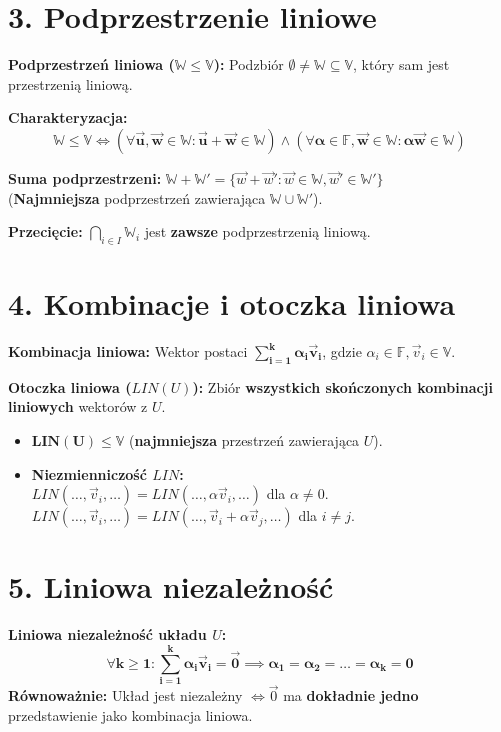 \documentclass[12pt,a4paper]{article}
\begin{document}
\section*{3. Podprzestrzenie liniowe}
\noindent\textbf{Podprzestrzeń liniowa ($\mathbb{W} \le \mathbb{V}$):} Podzbiór $\emptyset \neq \mathbb{W} \subseteq \mathbb{V}$, który sam jest przestrzenią liniową.

\noindent\textbf{Charakteryzacja:} 
$$ \mathbf{\mathbb{W} \le \mathbb{V} \iff (\forall \vec{u}, \vec{w} \in \mathbb{W}: \vec{u} + \vec{w} \in \mathbb{W}) \land (\forall \alpha \in \mathbb{F}, \vec{w} \in \mathbb{W}: \alpha\vec{w} \in \mathbb{W})} $$

\noindent\textbf{Suma podprzestrzeni:} $\mathbb{W} + \mathbb{W}' = \{\vec{w} + \vec{w}' : \vec{w} \in \mathbb{W}, \vec{w}' \in \mathbb{W}'\}$ \\
(\textbf{Najmniejsza} podprzestrzeń zawierająca $\mathbb{W} \cup \mathbb{W}'$).

\noindent\textbf{Przecięcie:} $\bigcap_{i \in I} \mathbb{W}_i$ jest \textbf{zawsze} podprzestrzenią liniową.

\section*{4. Kombinacje i otoczka liniowa}
\noindent\textbf{Kombinacja liniowa:} Wektor postaci $\mathbf{\sum_{i=1}^k \alpha_i \vec{v}_i}$, gdzie $\alpha_i \in \mathbb{F}, \vec{v}_i \in \mathbb{V}$.

\noindent\textbf{Otoczka liniowa ($LIN(U)$):} Zbiór \textbf{wszystkich skończonych kombinacji liniowych} wektorów z $U$.
\begin{itemize}
    \item $\mathbf{LIN(U) \le \mathbb{V}}$ (\textbf{najmniejsza} przestrzeń zawierająca $U$).
    \item \textbf{Niezmienniczość $LIN$:} \\
    $LIN(\dots, \vec{v}_i, \dots) = LIN(\dots, \alpha\vec{v}_i, \dots)$ dla $\alpha \neq 0$. \\
    $LIN(\dots, \vec{v}_i, \dots) = LIN(\dots, \vec{v}_i + \alpha \vec{v}_j, \dots)$ dla $i \neq j$.
\end{itemize}

\section*{5. Liniowa niezależność}
\noindent\textbf{Liniowa niezależność układu $U$:} 
$$ \mathbf{\forall k \ge 1: \sum_{i=1}^k \alpha_i \vec{v}_i = \vec{0} \implies \alpha_1 = \alpha_2 = \dots = \alpha_k = 0} $$
\textbf{Równoważnie:} Układ jest niezależny $\iff \vec{0}$ ma \textbf{dokładnie jedno} przedstawienie jako kombinacja liniowa.
\end{document}
